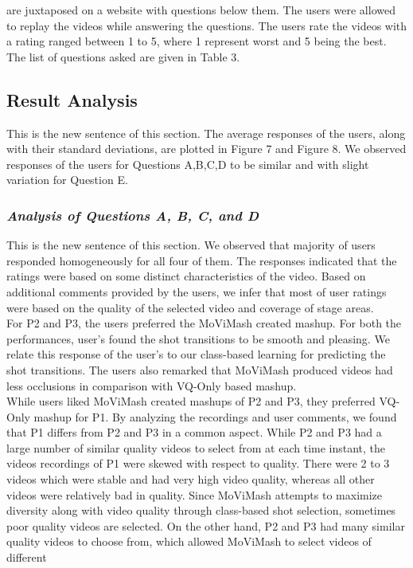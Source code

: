 \documentclass{sig-alternate}
\begin{document}
{{{are juxtaposed on a website with questions below them. The users 
were allowed to replay the videos while answering the questions.
The users rate the videos with a rating ranged between 1 to 5, where
1 represent worst and 5 being the best. The list of questions asked
are given in Table 3.

\subsection{Result Analysis}
This is the new sentence of this section.
The average responses of the users, along with their standard
deviations, are plotted in Figure 7 and Figure 8. We observed responses
of the users for Questions A,B,C,D to be similar and with
slight variation for Question E.
\subsubsection{\textit{Analysis of Questions A, B, C, and D}}
This is the new sentence of this section.
We observed that majority of users responded homogeneously
for all four of them. The responses indicated that the ratings were
based on some distinct characteristics of the video. Based on additional
comments provided by the users, we infer that most of user
ratings were based on the quality of the selected video and coverage
of stage areas.\\
For P2 and P3, the users preferred the MoViMash created mashup.
For both the performances, user’s found the shot transitions to be
smooth and pleasing. We relate this response of the user’s to our
class-based learning for predicting the shot transitions. The users
also remarked that MoViMash produced videos had less occlusions
in comparison with VQ-Only based mashup.\\
While users liked MoViMash created mashups of P2 and P3,
they preferred VQ-Only mashup for P1. By analyzing the recordings
and user comments, we found that P1 differs from P2 and P3 in
a common aspect. While P2 and P3 had a large number of similar
quality videos to select from at each time instant, the videos recordings
of P1 were skewed with respect to quality. There were 2 to 3
videos which were stable and had very high video quality, whereas
all other videos were relatively bad in quality. Since MoViMash
attempts to maximize diversity along with video quality through
class-based shot selection, sometimes poor quality videos are selected.
On the other hand, P2 and P3 had many similar quality videos
to choose from, which allowed MoViMash to select videos of different
}}}
\end{document}
